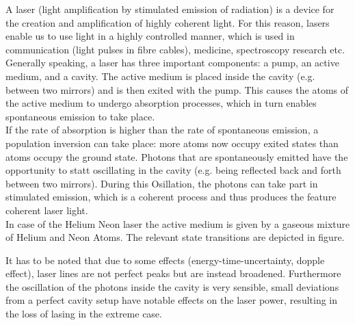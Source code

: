 \documentclass[../main.tex]{subfiles}
\begin{document}
    A laser (light amplification by stimulated emission of radiation) is a device for the creation and amplification of highly coherent light. For this reason, lasers enable us to use light in a highly controlled manner, which is used in communication (light pulses in fibre cables), medicine, spectroscopy research etc.\\ 

    \noindent Generally speaking, a laser has three important components: a pump, an active medium, and a cavity. The active medium is placed inside the cavity (e.g. between two mirrors) and is then exited with the pump. This causes the atoms of the active medium to undergo absorption processes, which in turn enables spontaneous emission to take place.\\

    \noindent If the rate of absorption is higher than the rate of spontaneous emission, a population inversion can take place: more atoms now occupy exited states than atoms occupy the ground state. Photons that are spontaneously emitted have the opportunity to statt oscillating in the cavity (e.g. being reflected back and forth between two mirrors). During this Osillation, the photons can take part in stimulated emission, which is a coherent process and thus produces the feature coherent laser light.\\

    \noindent In case of the Helium Neon laser the active medium is given by a gaseous mixture of Helium and Neon Atoms. The relevant state transitions are depicted in figure.

    \noindent It has to be noted that due to some effects (energy-time-uncertainty, dopple effect), laser lines are not perfect peaks but are instead broadened. Furthermore the oscillation of the photons inside the cavity is very sensible, small deviations from a perfect cavity setup have notable effects on the laser power, resulting in the loss of lasing in the extreme case.
\end{document}
